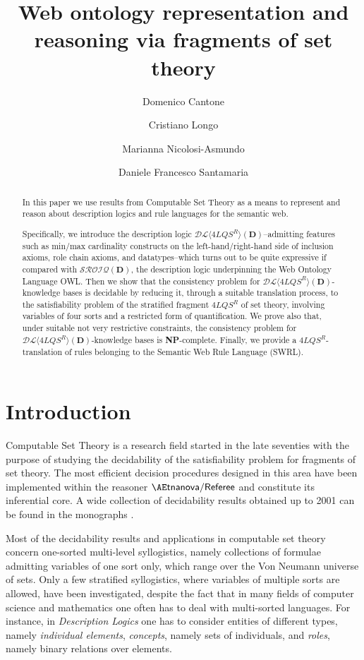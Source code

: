 \documentclass[a4paper]{llncs}
\title{Web ontology representation and reasoning via fragments of set theory}
\author{Domenico Cantone \and  Cristiano Longo \and Marianna Nicolosi-Asmundo \and Daniele Francesco Santamaria}
\institute{
University of Catania, Dept. of Mathematics and Computer Science\\
~email:~\texttt{\{cantone,longo,nicolosi\}@dmi.unict.it, daniele.f.santamaria@gmail.com}
}
\newcommand{\dlss}{\mathcal{DL}\langle 4LQS^R\rangle(\D)}
\newcommand{\sroiqd}{\ensuremath{\mathcal{SROIQ}(\D)}}
\newcommand{\D}{\mathbf{D}}
\begin{document}
\maketitle


\begin{abstract}
In this paper we use results from Computable Set Theory as a means to represent and reason about description logics and rule languages for the semantic web.

Specifically, we introduce the description logic $\dlss$--admitting features such as min/max cardinality constructs on the left-hand/right-hand side of inclusion axioms, role chain axioms, and datatypes--which turns out to be quite expressive if compared with \sroiqd, the description logic underpinning the Web Ontology Language OWL.
Then we show that the consistency problem for $\dlss$-knowledge bases is decidable by reducing it, through a suitable translation process, to the satisfiability problem of the stratified fragment $4LQS^R$ of set theory, involving variables of four sorts and a restricted form of quantification.
We prove also that, under suitable not very restrictive constraints, the consistency problem for $\dlss$-knowledge bases is \textbf{NP}-complete.
Finally, we provide a $4LQS^R$-translation of rules belonging to the Semantic Web Rule Language (SWRL).

\end{abstract}




\section{Introduction}


Computable Set Theory is a research field started in the late seventies with the purpose of studying the decidability of the satisfiability problem for fragments of set theory. The most efficient decision procedures designed in this area have been implemented within the reasoner $\mathsf{{\AE}tnanova/Referee}$ \cite{SchwCanOmoPol11} and constitute its inferential core.
A wide collection of decidability results obtained up to 2001 can be found in the monographs \cite{CaFeOm90,CaOmPo01}.


Most of the decidability results and applications in computable set theory concern one-sorted multi-level syllogistics, namely collections of formulae admitting variables of one sort only, which range over the Von Neumann universe of sets. Only a few stratified syllogistics, where variables of multiple sorts are allowed, have been investigated, despite the fact that in many fields of computer science and mathematics one often has to deal with multi-sorted languages.
For instance, in \emph{Description Logics} one has to consider entities of different types, namely \emph{individual elements}, \emph{concepts}, namely sets of individuals, and \emph{roles}, namely binary relations over elements.
\end{document}
